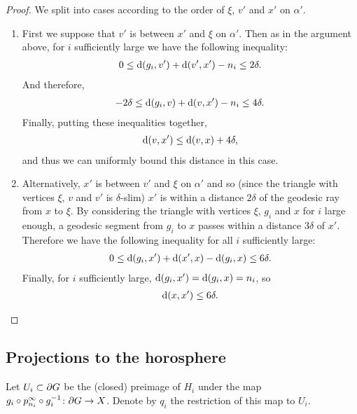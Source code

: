 \documentclass[a4paper]{article}
\begin{document}
\begin{proof}
  We split into cases according to the order of $\xi$, $v'$ and $x'$ on
  $\alpha'$.
  \begin{enumerate}
    \item
      First we suppose that $v'$ is between $x'$ and $\xi$ on $\alpha'$. Then as
      in the argument above, for $i$ sufficiently large we have the following
      inequality:
      \begin{align*}
        0 \leq \operatorname{d}(g_i, v') + \operatorname{d}(v', x') - n_i \leq 2\delta.
      \end{align*}
      And therefore,
      \begin{align*}
        -2\delta \leq \operatorname{d}(g_i, v) + \operatorname{d}(v, x') - n_i \leq 4\delta.
      \end{align*}
      Finally, putting these inequalities together,
      \begin{align*}
        \operatorname{d}(v,x') \leq \operatorname{d}(v,x) + 4\delta,
      \end{align*}
      and thus we can uniformly bound this distance in this case.
    \item
      Alternatively, $x'$ is between $v'$ and $\xi$ on $\alpha'$ and so (since
      the triangle with vertices $\xi$, $v$ and $v'$ is $\delta$-slim) $x'$ is
      within a distance $2\delta$ of the geodesic ray from $x$ to $\xi$. By
      considering the triangle with vertices $\xi$, $g_i$ and $x$ for $i$ large
      enough, a geodesic segment from $g_i$ to $x$ passes within a distance
      $3\delta$ of $x'$. Therefore we have the following inequality for all $i$
      sufficiently large:
      \begin{align*}
        0 \leq \operatorname{d}(g_i, x') + \operatorname{d}(x', x) - \operatorname{d}(g_i, x) \leq 6\delta.
      \end{align*}
      Finally, for $i$ sufficiently large, $\operatorname{d}(g_i, x') = \operatorname{d}(g_i, x) = n_i$,
      so
      \begin{align*}
        \operatorname{d}(x,x') \leq 6\delta.
      \end{align*}
  \end{enumerate}
\end{proof}

\subsection{Projections to the horosphere}

\begin{definition}
  Let $U_i \subset \partial G$ be the (closed) preimage of $H_i$ under the map 
  $g_i \circ p^\infty_{n_i} \circ g_i^{-1} \colon \partial G \to X$.
  Denote by $q_i$ the restriction of this map to $U_i$.
\end{definition}
\end{document}
